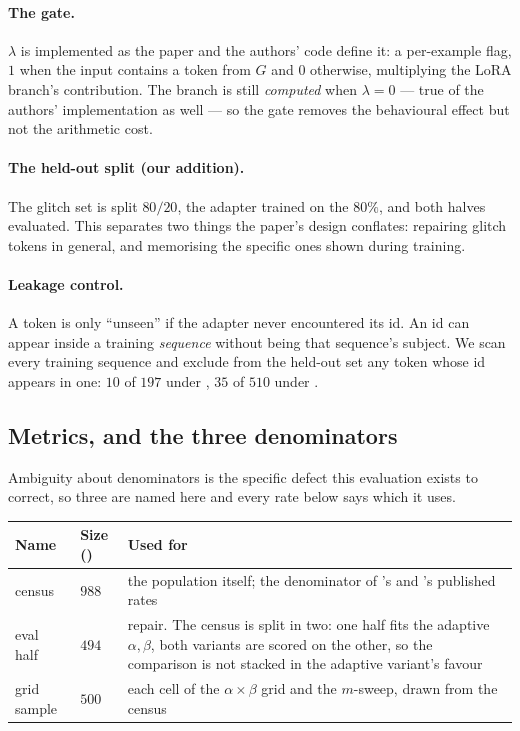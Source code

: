 \paragraph{The gate.} $\lambda$ is implemented as the paper and the authors' code
define it: a per-example flag, $1$ when the input contains a token from $G$ and
$0$ otherwise, multiplying the LoRA branch's contribution. The branch is still
\emph{computed} when $\lambda = 0$ --- true of the authors' implementation as
well --- so the gate removes the behavioural effect but not the arithmetic cost.

\paragraph{The held-out split (our addition).} The glitch set is split $80/20$,
the adapter trained on the $80\%$, and both halves evaluated. This separates two
things the paper's design conflates: repairing glitch tokens in general, and
memorising the specific ones shown during training.

\paragraph{Leakage control.} A token is only ``unseen'' if the adapter never
encountered its id. An id can appear inside a training \emph{sequence} without
being that sequence's subject. We scan every training sequence and exclude from
the held-out set any token whose id appears in one: $10$ of $197$ under
\Ppaper{}, $35$ of $510$ under \Pcode{}.

\subsection{Metrics, and the three denominators}
\label{sec:denominators}

Ambiguity about denominators is the specific defect this evaluation exists to
correct, so three are named here and every rate below says which it uses.

\begin{center}
\begin{tabular}{llp{7.6cm}}
\toprule
Name & Size (\Ppaper{}) & Used for \\
\midrule
census      & $988$ & the population itself; the denominator of \gp{}'s and \gc{}'s published rates \\
eval half   & $494$ & \gp{} repair. The census is split in two: one half fits the adaptive $\alpha,\beta$, both variants are scored on the other, so the comparison is not stacked in the adaptive variant's favour \\
grid sample & $500$ & each cell of the $\alpha \times \beta$ grid and the $m$-sweep, drawn from the census \\
\bottomrule
\end{tabular}
\end{center}

